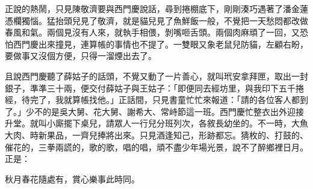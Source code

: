 正說的熱鬧，只見陳敬濟要與西門慶說話，尋到捲棚底下，剛剛湊巧遇著了潘金蓮憑欄獨惱。猛抬頭兒見了敬濟，就是貓兒見了魚鮮飯一般，不覺把一天愁悶都改做春風和氣。兩個見沒有人來，就執手相偎，剝嘴咂舌頭。兩個肉麻頑了一回，又恐怕西門慶出來撞見，連算帳的事情也不提了。一雙眼又象老鼠兒防貓，左顧右盼，要做事又沒個方便，只得一溜煙出去了。

且說西門慶聽了薛姑子的話頭，不覺又動了一片善心，就叫玳安拿拜匣，取出一封銀子，準準三十兩，便交付薛姑子與王姑子：「即便同去經坊里，與我印下五千捲經，待完了，我就算帳找他。」正話間，只見書童忙忙來報道：「請的各位客人都到了。」少不的是吳大舅、花大舅、謝希大、常峙節這一班。西門慶忙整衣出外迎接升堂。就叫小廝擺下桌兒，請眾人一行兒分班列次，各敘長幼坐的。不一時，大魚大肉、時新果品，一齊兒捧將出來。只見酒逢知己，形跡都忘。猜枚的、打鼓的、催花的，三拳兩謊的，歌的歌，唱的唱，頑不盡少年場光景，說不了醉鄉裡日月。正是：

秋月春花隨處有，賞心樂事此時同。

